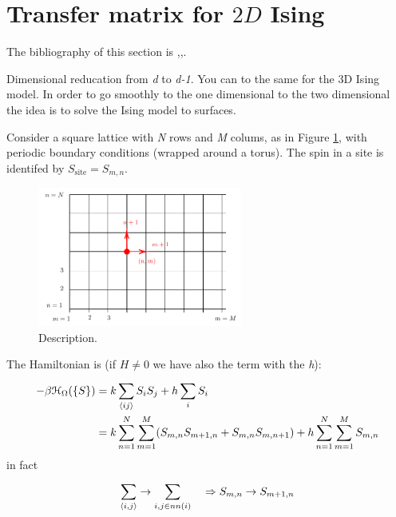 \documentclass[../main/main.tex]{subfiles}
\begin{document}
\section{Transfer matrix for \( 2D \) Ising}
The bibliography of this section is  \cite{9_lesson_1},\cite{9_lesson_2},\cite{9_lesson_3}.

Dimensional reducation from \emph{d} to \emph{d-1}. You can to the same for the 3D Ising model. In order to go smoothly to the one dimensional to the two dimensional the idea is to solve the Ising model to surfaces.

Consider a square lattice with \emph{N} rows and \emph{M} colums, as in Figure \ref{fig:9_4}, with periodic boundary conditions (wrapped around a torus).
The spin in a site is identifed by \( S_{\text{site}} = S_{m,n} \).
\begin{figure}[h!]
\centering
\includegraphics[width=0.6\textwidth]{../lessons/9_image/4.pdf}
\caption{\label{fig:9_4} Description.}
\end{figure}
The Hamiltonian is (if \( H \neq 0 \) we have also the term with the \emph{h}):
\begin{equation}
\begin{split}
  -\beta \mathcal{H}_ \Omega  ( \{ S \}  ) &= k \sum_{\expval{ij} }^{} S_i S_j + h \sum_{i}^{} S_i  \\
  & = k \sum_{n=1}^{N} \sum_{m=1}^{M} (S_{m,n} S_{m+1,n}+S_{m,n}S_{m,n+1}) + h \sum_{n=1}^{N} \sum_{m=1}^{M} S_{m,n}
\end{split}
\end{equation}
in fact
\begin{equation}
  \sum_{\expval{i,j} }^{}  \rightarrow \sum_{i,j \in nn(i)}^{} \quad \Rightarrow   S_{m,n} \rightarrow S_{m+1,n}
\end{equation}
\end{document}
